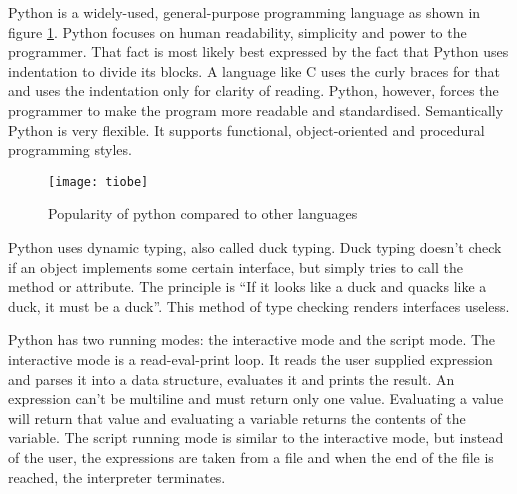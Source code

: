 Python is a widely-used, general-purpose programming language as shown in figure
\ref{python-popularity}. Python focuses on human readability, simplicity and
power to the
programmer.\cite{website:python-zen,website:python-faq-creation-reason} That
fact is most likely best expressed by the fact that Python uses indentation to
divide its blocks. A language like C uses the curly braces for that and uses the
indentation only for clarity of reading. Python, however, forces the programmer
to make the program more readable and standardised. Semantically Python is very
flexible. It supports functional, object-oriented and procedural programming
styles.

\begin{figure}[htp]
\begin{center}
  \texttt{[image: tiobe]}
  \caption[Python popularity]{Popularity of python compared to other
  languages\cite{website:tiobe-index}}
  \label{python-popularity}
\end{center}
\end{figure}

Python uses dynamic typing, also called duck typing. Duck typing doesn't check
if an object implements some certain interface, but simply tries to call the
method or attribute. The principle is ``If it looks like a duck and quacks like
a duck, it must be a duck''.\cite[duck-typing]{website:python-glossary} This
method of type checking renders interfaces useless. 


Python has two running modes: the interactive mode and the script mode. The
interactive mode is a read-eval-print loop. It reads the user supplied
expression and parses it into a data structure, evaluates it and prints the
result. An expression can't be multiline and must return only one value.
Evaluating a value will return that value and evaluating a variable returns the
contents of the variable. The script running mode is similar to the interactive
mode, but instead of the user, the expressions are taken from a file and when
the end of the file is reached, the interpreter terminates.







